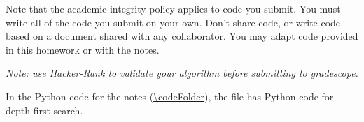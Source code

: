 \documentclass[11pt]{article}
\begin{document}
\begin{enumerate}[label=(\alph*)]
  Note that
  the academic-integrity policy applies to code you submit.
  You must write all of the code you submit on your own.
  Don't share code, or write code based on a document shared with any collaborator.
  You may adapt code provided in this homework or with the notes.

  \emph{Note: use Hacker-Rank to validate your algorithm before submitting\ifGradescope{} to gradescope\fi.}


\end{enumerate}

In the Python code for the notes (\url{\codeFolder}),
the file 
has Python code for depth-first search.

\newpage

\setlength{\ITEMHT}{0.4in}
{\injectEnumerate
{}
}
\end{document}
